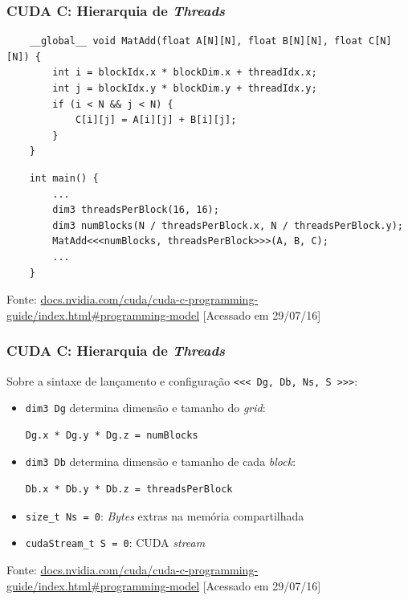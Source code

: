 \documentclass[10pt, compress]{beamer}
\begin{document}
\begin{frame}[fragile]
    \frametitle{CUDA C: Hierarquia de \textit{Threads}}
    \begin{lstlisting}
    __global__ void MatAdd(float A[N][N], float B[N][N], float C[N][N]) {
        int i = blockIdx.x * blockDim.x + threadIdx.x;
        int j = blockIdx.y * blockDim.y + threadIdx.y;
        if (i < N && j < N) {
            C[i][j] = A[i][j] + B[i][j];
        }
    }
    \end{lstlisting}
    \pause
    \begin{lstlisting}
    int main() {
        ...
        dim3 threadsPerBlock(16, 16);
        dim3 numBlocks(N / threadsPerBlock.x, N / threadsPerBlock.y);
        MatAdd<<<numBlocks, threadsPerBlock>>>(A, B, C);
        ...
    }
    \end{lstlisting}
    \vfill

    \begin{center}
        \tiny{Fonte: \url{docs.nvidia.com/cuda/cuda-c-programming-guide/index.html\#programming-model} [Acessado em 29/07/16]}
    \end{center}
\end{frame}

\begin{frame}[fragile]
    \frametitle{CUDA C: Hierarquia de \textit{Threads}}
    Sobre a sintaxe de lançamento e configuração \texttt{\scriptsize{\alert{<<<} Dg, Db, Ns, S \alert{>>>}}}:
    \begin{itemize}
        \item \texttt{\alert{dim3} Dg} determina dimensão e tamanho do \textit{grid}:
\begin{lstlisting}
Dg.x * Dg.y * Dg.z = numBlocks
\end{lstlisting}
        \pause
        \item \texttt{\alert{dim3} Db} determina dimensão e tamanho de cada \textit{block}:
\begin{lstlisting}
Db.x * Db.y * Db.z = threadsPerBlock
\end{lstlisting}
        \pause
        \item \texttt{\alert{size\_t} Ns = 0}: \textit{Bytes} extras na memória compartilhada
        \item \texttt{\alert{cudaStream\_t} S = 0}: CUDA \textit{stream}
    \end{itemize}

    \vfill

    \begin{center}
        \tiny{Fonte: \url{docs.nvidia.com/cuda/cuda-c-programming-guide/index.html\#programming-model} [Acessado em 29/07/16]}
    \end{center}
\end{frame}
\end{document}
